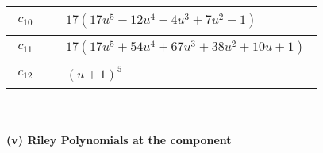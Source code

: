 \documentclass[1p]{elsarticle_modified}
\theoremstyle{definition}
\begin{document}
\begin{tabular}{m{50pt}|m{274pt}}
\hline $$\begin{aligned}c_{10}\end{aligned}$$&$\begin{aligned}
&17(17 u^5-12 u^4-4 u^3+7 u^2-1)
\end{aligned}$\\
\hline $$\begin{aligned}c_{11}\end{aligned}$$&$\begin{aligned}
&17(17 u^5+54 u^4+67 u^3+38 u^2+10 u+1)
\end{aligned}$\\
\hline $$\begin{aligned}c_{12}\end{aligned}$$&$\begin{aligned}
&(u+1)^5
\end{aligned}$\\
\hline
\end{tabular}\\~\\
\newpage\renewcommand{\arraystretch}{1}
\flushleft \textbf{(v) Riley Polynomials at the component}\newline \\
\end{document}
